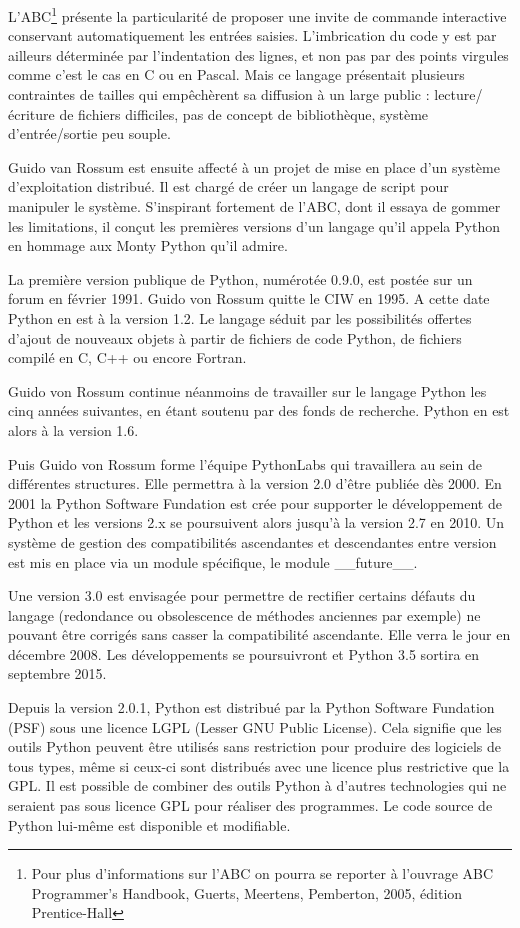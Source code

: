 \documentclass[12pt, a4paper]{article}
\begin{document}
L'ABC\footnote{Pour plus d'informations sur l'ABC on pourra se reporter à l'ouvrage ABC Programmer's Handbook, Guerts, Meertens, Pemberton, 2005, édition Prentice-Hall} présente la particularité de proposer une invite de commande interactive conservant automatiquement les entrées saisies. L'imbrication du code y est par ailleurs déterminée par l'indentation des lignes, et non pas par des points virgules comme c'est le cas en C ou en Pascal. Mais ce langage présentait plusieurs contraintes de tailles qui empêchèrent sa diffusion à un large public : lecture/écriture de fichiers difficiles, pas de concept de bibliothèque, système d'entrée/sortie peu souple.

Guido van Rossum est ensuite affecté à un projet de mise en place d'un système d'exploitation distribué. Il est chargé de créer un langage de script pour manipuler le système. S'inspirant fortement de l'ABC, dont il essaya de gommer les limitations, il conçut les premières versions d'un langage qu'il appela Python en hommage aux Monty Python qu'il admire.

La première version publique de Python, numérotée 0.9.0, est postée sur un forum en février 1991. Guido von Rossum quitte le CIW en 1995. A cette date Python en est à la version 1.2. Le langage séduit par les possibilités offertes d'ajout de nouveaux objets à partir de fichiers de code Python, de fichiers compilé en C, C++ ou encore Fortran.

Guido von Rossum continue néanmoins de travailler sur le langage Python les cinq années suivantes, en étant soutenu par des fonds de recherche. Python en est alors à la version 1.6.

Puis Guido von Rossum forme l'équipe PythonLabs qui travaillera au sein de différentes structures. Elle permettra à la version 2.0 d'être publiée dès 2000. En 2001 la Python Software Fundation est crée pour supporter le développement de Python et les versions 2.x se poursuivent alors jusqu'à la version 2.7 en 2010. Un système de gestion des compatibilités ascendantes et descendantes entre version est mis en place via un module spécifique, le module \_\_future\_\_.

Une version 3.0  est envisagée pour permettre de rectifier certains défauts du langage (redondance ou obsolescence de méthodes anciennes par exemple) ne pouvant être corrigés sans casser la compatibilité ascendante. Elle verra le jour en décembre 2008. Les développements se poursuivront et Python 3.5 sortira en septembre 2015. 

Depuis la version 2.0.1, Python est distribué par la Python Software Fundation (PSF) sous une licence LGPL (Lesser GNU Public License). Cela signifie que les outils Python peuvent être utilisés sans restriction pour produire des logiciels de tous types, même si ceux-ci sont distribués avec une licence plus restrictive que la GPL. Il est possible de combiner des outils Python à d'autres technologies qui ne seraient pas sous licence GPL pour réaliser des programmes. Le code source de Python lui-même est disponible et modifiable.
\end{document}
